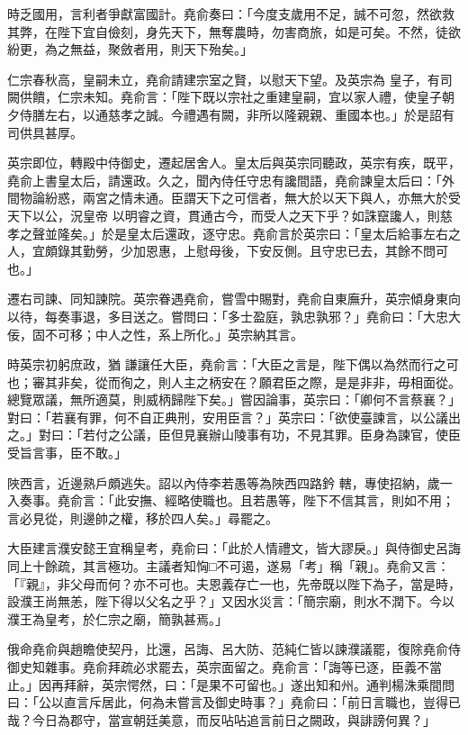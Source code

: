 \begin{pinyinscope}
 時乏國用，言利者爭獻富國計。堯俞奏曰：「今度支歲用不足，誠不可忽，然欲救其弊，在陛下宜自儉刻，身先天下，無奪農時，勿害商旅，如是可矣。不然，徒欲紛更，為之無益，聚斂者用，則天下殆矣。」



 仁宗春秋高，皇嗣未立，堯俞請建宗室之賢，以慰天下望。及英宗為
 皇子，有司闕供饋，仁宗未知。堯俞言：「陛下既以宗社之重建皇嗣，宜以家人禮，使皇子朝夕侍膳左右，以通慈孝之誠。今禮遇有闕，非所以隆親親、重國本也。」於是詔有司供具甚厚。



 英宗即位，轉殿中侍御史，遷起居舍人。皇太后與英宗同聽政，英宗有疾，既平，堯俞上書皇太后，請還政。久之，聞內侍任守忠有讒間語，堯俞諫皇太后曰：「外間物論紛惑，兩宮之情未通。臣謂天下之可信者，無大於以天下與人，亦無大於受天下以公，況皇帝
 以明睿之資，貫通古今，而受人之天下乎？如誅竄讒人，則慈孝之聲並隆矣。」於是皇太后還政，逐守忠。堯俞言於英宗曰：「皇太后給事左右之人，宜頗錄其勤勞，少加恩惠，上慰母後，下安反側。且守忠已去，其餘不問可也。」



 遷右司諫、同知諫院。英宗眷遇堯俞，嘗雪中賜對，堯俞自東廡升，英宗傾身東向以待，每奏事退，多目送之。嘗問曰：「多士盈庭，孰忠孰邪？」堯俞曰：「大忠大佞，固不可移；中人之性，系上所化。」英宗納其言。



 時英宗初躬庶政，猶
 謙讓任大臣，堯俞言：「大臣之言是，陛下偶以為然而行之可也；審其非矣，從而徇之，則人主之柄安在？願君臣之際，是是非非，毋相面從。總覽眾議，無所適莫，則威柄歸陛下矣。」嘗因論事，英宗曰：「卿何不言蔡襄？」對曰：「若襄有罪，何不自正典刑，安用臣言？」英宗曰：「欲使臺諫言，以公議出之。」對曰：「若付之公議，臣但見襄辦山陵事有功，不見其罪。臣身為諫官，使臣受旨言事，臣不敢。」



 陜西言，近邊熟戶頗逃失。詔以內侍李若愚等為陜西四路鈐
 轄，專使招納，歲一入奏事。堯俞言：「此安撫、經略使職也。且若愚等，陛下不信其言，則如不用；言必見從，則邊帥之權，移於四人矣。」尋罷之。



 大臣建言濮安懿王宜稱皇考，堯俞曰：「此於人情禮文，皆大謬戾。」與侍御史呂誨同上十餘疏，其言極功。主議者知恟□不可遏，遂易「考」稱「親」。堯俞又言：「『親』，非父母而何？亦不可也。夫恩義存亡一也，先帝既以陛下為子，當是時，設濮王尚無恙，陛下得以父名之乎？」又因水災言：「簡宗廟，則水不潤下。今以
 濮王為皇考，於仁宗之廟，簡孰甚焉。」



 俄命堯俞與趙瞻使契丹，比還，呂誨、呂大防、范純仁皆以諫濮議罷，復除堯俞侍御史知雜事。堯俞拜疏必求罷去，英宗面留之。堯俞言：「誨等已逐，臣義不當止。」因再拜辭，英宗愕然，曰：「是果不可留也。」遂出知和州。通判楊洙乘間問曰：「公以直言斥居此，何為未嘗言及御史時事？」堯俞曰：「前日言職也，豈得已哉？今日為郡守，當宣朝廷美意，而反呫呫追言前日之闕政，與誹謗何異？」




\end{pinyinscope}
